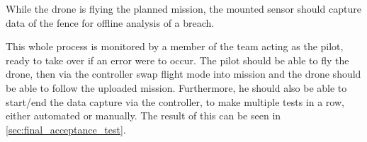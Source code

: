 \documentclass[../Head/Main.tex]{subfiles}
\begin{document}
While the drone is flying the planned mission, the mounted sensor should capture data of the fence for offline analysis of a breach.  

\par
This whole process is monitored by a member of the team acting as the pilot, ready to take over if an error were to occur. The pilot should be able to fly the drone, then via the controller swap flight mode into mission and the drone should be able to follow the uploaded mission. Furthermore, he should also be able to start/end the data capture via the controller, to make multiple tests in a row, either automated or manually. The result of this can be seen in \autoref{sec:final_acceptance_test}.
\end{document}
